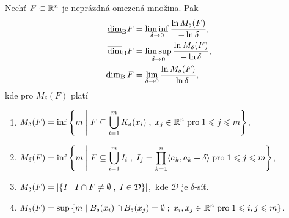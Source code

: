\begin{theorem}\label{thm:ekvivalentni-def-box-counting-dimenze}
    Nechť $F\subset \mathbb{R}^n$ je neprázdná omezená množina. Pak
    \begin{align*}
        \underline{\dim}_\textup{B}{F}&=\liminf_{\delta\to 0}\dfrac{\ln{M_\delta(F)}}{-\ln{\delta}},\\
        \overline{\dim}_\textup{B}{F}&=\limsup_{\delta\to 0}\dfrac{\ln{M_\delta(F)}}{-\ln{\delta}},\\
        \operatorname{dim_B}{F}&=\lim_{\delta\to 0}\dfrac{\ln{M_\delta(F)}}{-\ln{\delta}},
    \end{align*}
    kde pro $M_\delta(F)$ platí
    \begin{enumerate}[label=(\roman*)]
        \item\label{thm:pokryti-delta-uz-koulemi} $\displaystyle M_\delta(F)=\inf\left\{m\;\middle|\;F\subseteq\bigcup\limits_{i=1}^m K_\delta(x_i)\;,\;x_j\in\mathbb{R}^n\;\text{pro}\;1\leqslant j\leqslant m\right\}$,
        \item\label{thm:pokryti-delta-kvadry} $\displaystyle M_\delta(F)=\inf\left\{m\;\middle|\;F\subseteq\bigcup\limits_{i=1}^m I_i\;,\;I_j=\prod_{k=1}^{n}\langle a_k,a_k+\delta\rangle\;\text{pro}\;1\leqslant j\leqslant m\right\}$,
        \item\label{thm:pokryti-delta-sit} $\displaystyle M_\delta(F)=\left|\left\{I\;\middle|\;I\cap F\neq\emptyset\;,\;I\in\mathcal{D}\right\}\right|$,~kde $\mathcal{D}$ je $\delta$-síť.
        \item\label{thm:pokryti-delta-dis-ot-koulemi} $\displaystyle M_\delta(F)=\sup\left\{m\;\middle|\;B_\delta(x_i)\cap B_\delta(x_j)=\emptyset\;;\;x_i,x_j\in\mathbb{R}^n\;\text{pro}\;1\leqslant i,j\leqslant m\right\}$.
    \end{enumerate}
\end{theorem}

